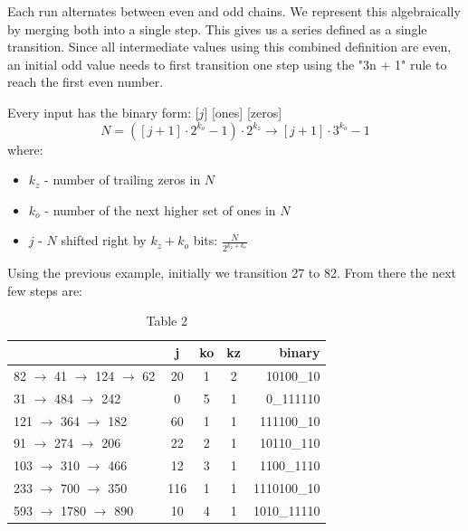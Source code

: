 \documentclass[preprint]{sigplanconf}
\begin{document}
Each run alternates between even and odd chains. We represent this algebraically by merging both into a single step. This gives us a series defined as a single transition. Since all intermediate values using this combined definition are even, an initial odd value needs to first transition one step using the "3n + 1" rule to reach the first even number.

Every input has the binary form: [$j$] [ones] [zeros]
\[
    N = ([j + 1] \cdot 2^{k_o} - 1) \cdot 2^{k_z} \rightarrow [j + 1] \cdot 3^{k_o} - 1
\]
where:
\begin{itemize}
    \item $k_z$ - number of trailing zeros in $N$
    \item $k_o$ - number of the next higher set of ones in $N$
    \item $j$ - $N$ shifted right by $k_z + k_o$ bits: $\frac{N}{2^{k_z + k_o}}$
\end{itemize}

Using the previous example, initially we transition 27 to 82. From there the next few steps are:

\begin{table}
    \begin{center}
    \begin{tabular}{|l|c|c|c|r|}
        \hline
                                         & \textbf{j} & \textbf{ko} & \textbf{kz} & \textbf{binary} \\
        \hline
        82 $\to$ 41  $\to$  124 $\to$ 62 & 20         & 1           & 2           & 10100\_10       \\
        \hline
        31  $\to$  484 $\to$ 242         & 0          & 5           & 1           & 0\_111110       \\
        \hline
        121 $\to$  364 $\to$ 182         & 60         & 1           & 1           & 111100\_10      \\
        \hline
        91 $\to$  274 $\to$ 206          & 22         & 2           & 1           & 10110\_110      \\
        \hline
        103 $\to$  310 $\to$ 466         & 12         & 3           & 1           & 1100\_1110      \\
        \hline
        233 $\to$  700 $\to$ 350         & 116        & 1           & 1           & 1110100\_10     \\
        \hline
        593 $\to$ 1780 $\to$ 890         & 10         & 4           & 1           & 1010\_11110     \\
        \hline
    \end{tabular}
    \caption{Table 2}
    \label{tab-2}
\end{center}
\end{table}
\end{document}
